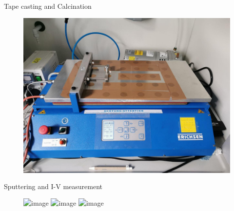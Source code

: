 \documentclass[hyperref={pdfpagelabels=false}, aspectratio=43, t]{beamer}  %
\begin{document}
\begin{frame}{Tape casting and Calcination}
	\begin{figure}
		\center
		\includegraphics[width=.65\textwidth]{figures/tc.jpg}
	\end{figure}
\end{frame}
\begin{frame}{Sputtering and I-V measurement}
	\begin{figure}
		\includegraphics<1>[width=.63\textwidth]{figures/sample1.jpg}
		\includegraphics<2>[width=.63\textwidth]{figures/sample2.jpg}
		\includegraphics<3>[width=.63\textwidth]{figures/sample3.jpg}
	\end{figure}
\end{frame}
\end{document}
